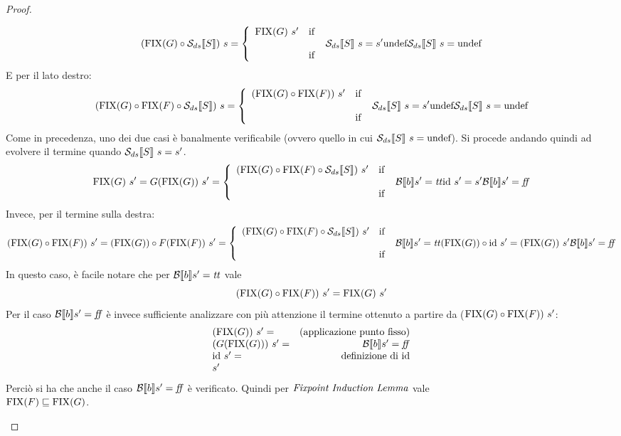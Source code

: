 {\begin{proof}
\begin{itemize}
  $$
  (\fixp{G} \circ \dsCtxt{S})\ s
      = \caseFun{\fixp{G}\ s'}
                {\dsCtxt{S}\ s = s'}
                {\undefDS}
                {\dsCtxt{S}\ s = \undefDS}
  $$
  E per il lato destro:
  $$
  (\fixp{G} \circ \fixp{F} \circ \dsCtxt{S})\ s
      = \caseFun{(\fixp{G} \circ \fixp{F})\ s'}
                {\dsCtxt{S}\ s = s'}
                {\undefDS}
                {\dsCtxt{S}\ s = \undefDS}
  $$
  Come in precedenza, uno dei due casi è banalmente verificabile (ovvero quello
  in cui $\mathcal{S}_{ds}\llbracket S \rrbracket\ s = \textrm{\normalfont{undef}}$). Si procede andando quindi ad evolvere il
  termine quando $\mathcal{S}_{ds}\llbracket S \rrbracket\ s = s'$.
  $$
  \fixp{G}\ s' =
  G(\fixp{G})\ s' = \caseFun{(\fixp{G} \circ \fixp{F} \circ \dsCtxt{S})\ s'}
                        {\B{b}' = \semtrue}
                        {\idDS\ s' = s'}
                        {\B{b}' = \semfalse}
  $$
  Invece, per il termine sulla destra:
  $$
  (\fixp{G} \circ \fixp{F})\ s' =
  (\fixp{G}) \circ F (\fixp{F})\ s' =
                \caseFun{(\fixp{G} \circ \fixp{F} \circ \dsCtxt{S})\ s'}
                        {\B{b}' = \semtrue}
                        {(\fixp{G}) \circ \idDS\ s' = (\fixp{G})\ s'}
                        {\B{b}' = \semfalse}
  $$
  In questo caso, è facile notare che per $\mathcal{B} \llbracket b \rrbracket s' = \mbox{\textit{tt}}$ vale
  $$
  (\textrm{\normalfont{FIX}}(G) \circ \textrm{\normalfont{FIX}}(F))\ s' = \textrm{\normalfont{FIX}}(G)\ s'
  $$
  Per il caso $\mathcal{B} \llbracket b \rrbracket s' = \mbox{\textit{ff}}$ è invece sufficiente analizzare con più
  attenzione il termine ottenuto a partire da ($\textrm{\normalfont{FIX}}(G) \circ \textrm{\normalfont{FIX}}(F))\ s'$:
  $$
  \begin{array}{lr}
  (\textrm{\normalfont{FIX}}(G))\ s' = & (\text{applicazione punto fisso}) \\
  (G (\textrm{\normalfont{FIX}}(G)))\ s' = & \mathcal{B} \llbracket b \rrbracket s' = \mbox{\textit{ff}} \\
  \textrm{\normalfont{id}}\ s' = & \text{definizione di \textrm{\normalfont{id}}} \\
  s'
  \end{array}
  $$
  Perciò si ha che anche il caso $\mathcal{B} \llbracket b \rrbracket s' = \mbox{\textit{ff}}$ è verificato.
  Quindi per $\textit{Fixpoint Induction Lemma}$ vale \\ $\textrm{\normalfont{FIX}}(F) \sqsubseteq \textrm{\normalfont{FIX}}(G)$.


\end{itemize}
\end{proof}}

